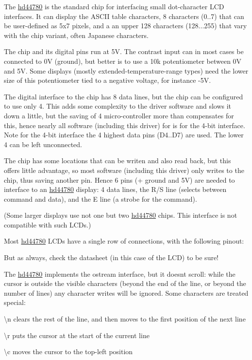 The \hyperlink{classhwlib_1_1hd44780}{hd44780} is the standard chip for interfacing small dot-\/character L\+CD interfaces. It can display the A\+S\+C\+II table characters, 8 characters (0..7) that can be user-\/defined as 5x7 pixels, and a an upper 128 characters (128...255) that vary with the chip variant, often Japanese characters.

The chip and its digital pins run at 5V. The contrast input can in most cases be connected to 0V (ground), but better is to use a 10k potentiometer between 0V and 5V. Some displays (mostly extended-\/temperature-\/range types) need the lower size of this potentiometer tied to a negative voltage, for instance -\/5V.

The digital interface to the chip has 8 data lines, but the chip can be configured to use only 4. This adds some complexity to the driver software and slows it down a little, but the saving of 4 micro-\/controller more than compensates for this, hence nearly all software (including this driver) for is for the 4-\/bit interface. Note for the 4-\/bit interface the 4 highest data pins (D4..D7) are used. The lower 4 can be left unconnected.

The chip has some locations that can be writen and also read back, but this offers little advantage, so most software (including this driver) only writes to the chip, thus saving another pin. Hence 6 pins (+ ground and 5V) are needed to interface to an \hyperlink{classhwlib_1_1hd44780}{hd44780} display\+: 4 data lines, the R/S line (selects between command and data), and the E line (a strobe for the command).



(Some larger displays use not one but two \hyperlink{classhwlib_1_1hd44780}{hd44780} chips. This interface is not compatible with such L\+C\+Ds.)

Most \hyperlink{classhwlib_1_1hd44780}{hd44780} L\+C\+Ds have a single row of connections, with the following pinout\+:



But as always, check the datasheet (in this case of the L\+CD) to be sure!

The \hyperlink{classhwlib_1_1hd44780}{hd44780} implements the ostream interface, but it doesn\textquotesingle{}t scroll\+: while the cursor is outside the visible characters (beyond the end of the line, or beyond the number of lines) any character writes will be ignored. Some characters are treated special\+:
\begin{DoxyItemize}
\item \textquotesingle{}\textbackslash{}n\textquotesingle{} clears the rest of the line, and then moves to the first position of the next line
\item \textquotesingle{}\textbackslash{}r\textquotesingle{} puts the cursor at the start of the current line
\item \textquotesingle{}\textbackslash{}c\textquotesingle{} moves the cursor to the top-\/left position
\end{DoxyItemize}

